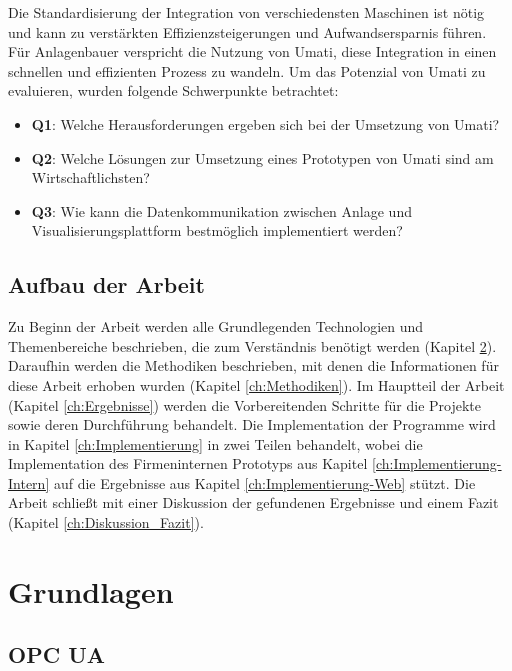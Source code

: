 \documentclass[a4paper, 12pt, oneside, toc=listofnumbered, bibliography=totoc]{scrbook}
\begin{document}
	Die Standardisierung der Integration von verschiedensten Maschinen ist nötig und kann zu verstärkten Effizienzsteigerungen und Aufwandsersparnis führen. Für Anlagenbauer verspricht die Nutzung von \ac{Umati}, diese Integration in einen schnellen und effizienten Prozess zu wandeln. Um das Potenzial von \ac{Umati} zu evaluieren, wurden folgende Schwerpunkte betrachtet:
	
	\begin{itemize}
		\item \textbf{Q1}: Welche Herausforderungen ergeben sich bei der Umsetzung von \ac{Umati}?
		\item \textbf{Q2}: Welche Lösungen zur Umsetzung eines Prototypen von \ac{Umati} sind am Wirtschaftlichsten?
		\item \textbf{Q3}: Wie kann die Datenkommunikation zwischen Anlage und Visualisierungsplattform bestmöglich implementiert werden?
	\end{itemize}
	
	\section{Aufbau der Arbeit}
	
	Zu Beginn der Arbeit werden alle Grundlegenden Technologien und Themenbereiche beschrieben, die zum Verständnis benötigt werden (Kapitel \ref{ch:Grundlagen}). Daraufhin werden die Methodiken beschrieben, mit denen die Informationen für diese Arbeit erhoben wurden (Kapitel \ref{ch:Methodiken}). Im Hauptteil der Arbeit (Kapitel \ref{ch:Ergebnisse}) werden die Vorbereitenden Schritte für die Projekte sowie deren Durchführung behandelt. Die Implementation der Programme wird in Kapitel \ref{ch:Implementierung} in zwei Teilen behandelt, wobei die Implementation des Firmeninternen Prototyps aus Kapitel \ref{ch:Implementierung-Intern} auf die Ergebnisse aus Kapitel \ref{ch:Implementierung-Web} stützt. Die Arbeit schließt mit einer Diskussion der gefundenen Ergebnisse und einem Fazit (Kapitel \ref{ch:Diskussion_Fazit}).
	
	
\chapter{Grundlagen}\label{ch:Grundlagen}
	
	
	
	\section{OPC UA}
	
\end{document}
